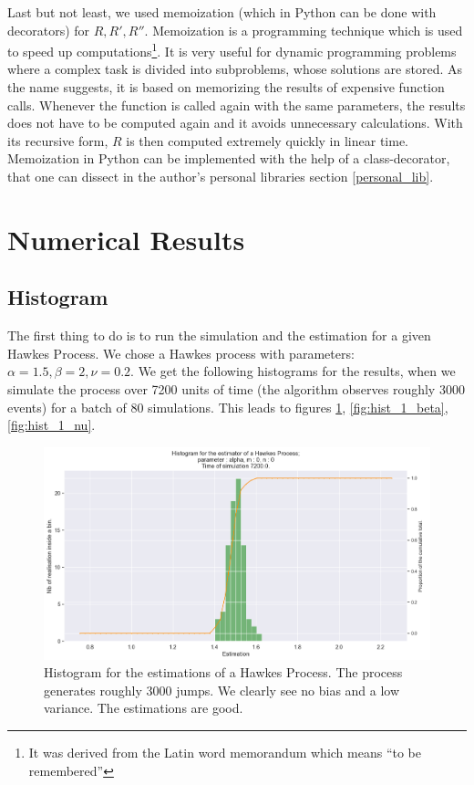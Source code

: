 Last but not least, we used memoization (which in Python can be done with decorators) for $R,R',R''$. Memoization is a programming technique which is used to speed up computations\footnote{It was derived from the Latin word memorandum which means “to be remembered”}. It is very useful for dynamic programming problems where a complex task is divided into subproblems, whose solutions are stored. As the name suggests, it is based on memorizing the results of expensive function calls. Whenever the function is called again with the same parameters, the results does not have to be computed again and it avoids unnecessary calculations. With its recursive form, $R$ is then computed extremely quickly in linear time. Memoization in Python can be implemented with the help of a class-decorator, that one can dissect in the author's personal libraries section \ref{personal_lib}. 




\section{Numerical Results}


\subsection{Histogram}
The first thing to do is to run the simulation and the estimation for a given Hawkes Process. We chose a Hawkes process with parameters: $\alpha = 1.5, \beta = 2, \nu = 0.2$. We get the following histograms for the results, when we simulate the process over 7200 units of time (the algorithm observes roughly 3000 events) for a batch of 80 simulations. This leads to figures \ref{fig:hist_1_alpha}, \ref{fig:hist_1_beta}, \ref{fig:hist_1_nu}.

\begin{figure}
\centering
\includegraphics[width = 0.75 \textwidth]{../imag/chap2/hist_1.png}
\caption{Histogram for the estimations of a Hawkes Process. The process generates roughly 3000 jumps. We clearly see no bias and a low variance. The estimations are good.}
\label{fig:hist_1_alpha}
\end{figure}


